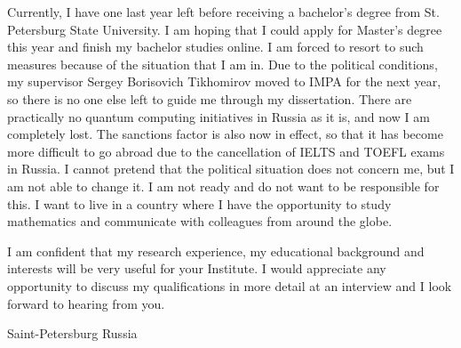 \documentclass[11pt,a4paper,sans]{moderncv}        %
\begin{document}
	Currently, I have one last year left before receiving a bachelor's degree from St. Petersburg State University. I am hoping that I could apply for Master's degree this year and finish my bachelor studies online. I am forced to resort to such measures because of the situation that I am in. Due to the political conditions, my supervisor Sergey Borisovich Tikhomirov moved to IMPA for the next year, so there is no one else left to guide me through my dissertation. There are practically no quantum computing initiatives in Russia as it is, and now I am completely lost. The sanctions factor is also now in effect, so that it has become more difficult to go abroad due to the cancellation of IELTS and TOEFL exams in Russia. I cannot pretend that the political situation does not concern me, but I am not able to change it. I am not ready and do not want to be responsible for this. I want to live in a country where I have the opportunity to study mathematics and communicate with colleagues from around the globe.
	
	I am confident that my research experience, my educational background and interests will be very useful for your Institute. I would appreciate any opportunity to discuss my qualifications in more detail at an interview and I look forward to hearing from you.
	
	\vspace*{\fill}
	\title{}
	\address{Novoizmailovsky prospect, 16k8}{Saint-Petersburg}{ Russia }
	\makeletterclosing
	\name{}{}
\end{document}

